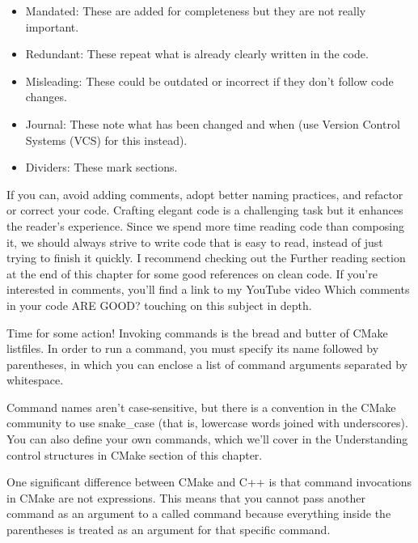 \begin{itemize}
\item
Mandated: These are added for completeness but they are not really important.

\item
Redundant: These repeat what is already clearly written in the code.

\item
Misleading: These could be outdated or incorrect if they don’t follow code changes.

\item
Journal: These note what has been changed and when (use Version Control Systems (VCS) for this instead).

\item
Dividers: These mark sections.
\end{itemize}

If you can, avoid adding comments, adopt better naming practices, and refactor or correct your code. Crafting elegant code is a challenging task but it enhances the reader’s experience. Since we spend more time reading code than composing it, we should always strive to write code that is easy to read, instead of just trying to finish it quickly. I recommend checking out the Further reading section at the end of this chapter for some good references on clean code. If you’re interested in comments, you’ll find a link to my YouTube video Which comments in your code ARE GOOD? touching on this subject in depth.


Time for some action! Invoking commands is the bread and butter of CMake listfiles. In order to run a command, you must specify its name followed by parentheses, in which you can enclose a list of command arguments separated by whitespace.


Command names aren’t case-sensitive, but there is a convention in the CMake community to use snake\_case (that is, lowercase words joined with underscores). You can also define your own commands, which we’ll cover in the Understanding control structures in CMake section of this chapter.

One significant difference between CMake and C++ is that command invocations in CMake are not expressions. This means that you cannot pass another command as an argument to a called command because everything inside the parentheses is treated as an argument for that specific command.

